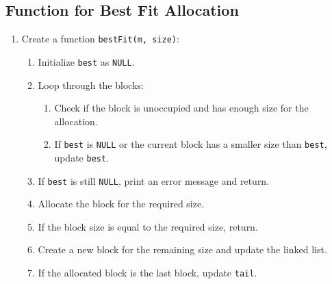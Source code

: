 {  \subsection{Function for Best Fit Allocation}
  \begin{enumerate}[label=\arabic*.,left=0pt]
    \item Create a function \texttt{bestFit(m, size)}:
          \begin{enumerate}[label=2.\arabic*.,left=0pt]
            \item Initialize \texttt{best} as \texttt{NULL}.
            \item Loop through the blocks:
                  \begin{enumerate}[label=2.2.\arabic*.,left=0pt]
                    \item Check if the block is unoccupied and has enough size for the allocation.
                    \item If \texttt{best} is \texttt{NULL} or the current block has a smaller size than \texttt{best}, update \texttt{best}.
                  \end{enumerate}
            \item If \texttt{best} is still \texttt{NULL}, print an error message and return.
            \item Allocate the block for the required size.
            \item If the block size is equal to the required size, return.
            \item Create a new block for the remaining size and update the linked list.
            \item If the allocated block is the last block, update \texttt{tail}.
          \end{enumerate}
  \end{enumerate}

}
